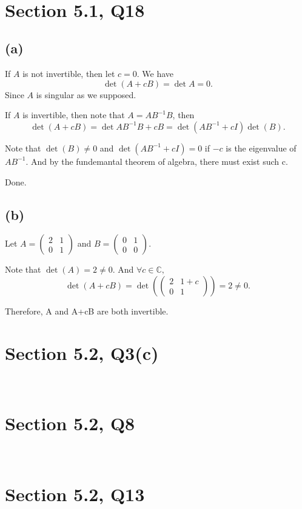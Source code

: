 \documentclass[12pt]{article}%
\begin{document}
~\ 

\section{Section 5.1, Q18}
\subsection{(a)}
If $A$ is not invertible, then let $c=0.$ We have $$\det{(A+cB)}=\det{A}=0.$$ Since $A$ is singular as we supposed.

If $A$ is invertible, then note that $A = AB^{-1}B$, then $$\det{(A+cB)}=\det{AB^{-1}B+cB}=\det{(AB^{-1}+cI)}\det{(B)}.$$

Note that $\det{(B)}\neq 0$ and $\det{(AB^{-1}+cI)}=0$ if $-c$ is the eigenvalue of $AB^{-1}$. And by the fundemantal theorem of algebra, there must exist such c.

Done.

\subsection{(b)}
Let $A=\begin{pmatrix}2&1\\0&1\end{pmatrix}$ and $B=\begin{pmatrix}0&1\\0&0\end{pmatrix}.$

Note that $\det{(A)}=2\neq 0.$ And $\forall c\in \mathbb{C},$ $$\det{(A+cB)}=\det{(\begin{pmatrix}2&1+c\\0&1\end{pmatrix})}=2\neq 0.$$

Therefore, A and A+cB are both invertible. 
~\ 

\section{Section 5.2, Q3(c)}

~\ 

\section{Section 5.2, Q8}

~\ 

\section{Section 5.2, Q13}

~\ 
\end{document}
